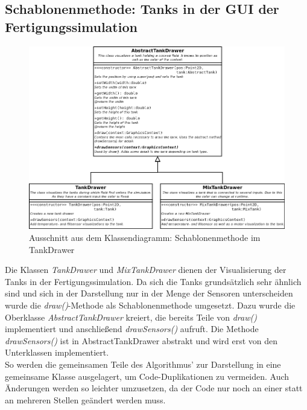 \documentclass[parskip=full]{scrartcl}
\begin{document}
\subsection{Schablonenmethode: Tanks in der GUI der Fertigungssimulation}
\begin{figure}[H]
  \centering
  \includegraphics[scale=0.4]{design/pattern-screenshots/template-TankDrawer.png}
  \caption{Ausschnitt aus dem Klassendiagramm: Schablonenmethode im TankDrawer}
\end{figure}
Die Klassen \emph{TankDrawer} und \emph{MixTankDrawer} dienen der Visualisierung der Tanks in der Fertigungssimulation. Da sich die Tanks grunds\"atzlich
sehr \"ahnlich sind und sich in der Darstellung nur in der Menge der Sensoren unterscheiden wurde die \emph{draw()}-Methode als Schablonenmethode umgesetzt.
Dazu wurde die Oberklasse \emph{AbstractTankDrawer} kreiert, die bereits Teile von \emph{draw()} implementiert und anschlie{\ss}end \emph{drawSensors()}
aufruft. Die Methode \emph{drawSensors()} ist in AbstractTankDrawer abstrakt und wird erst von den Unterklassen implementiert.\\
So werden die gemeinsamen Teile des Algorithmus' zur Darstellung in eine gemeinsame Klasse ausgelagert, um Code-Duplikationen zu vermeiden. Auch \"Anderungen
werden so leichter umzusetzen, da der Code nur noch an einer statt an mehreren Stellen ge\"andert werden muss.

\pagebreak
\end{document}
